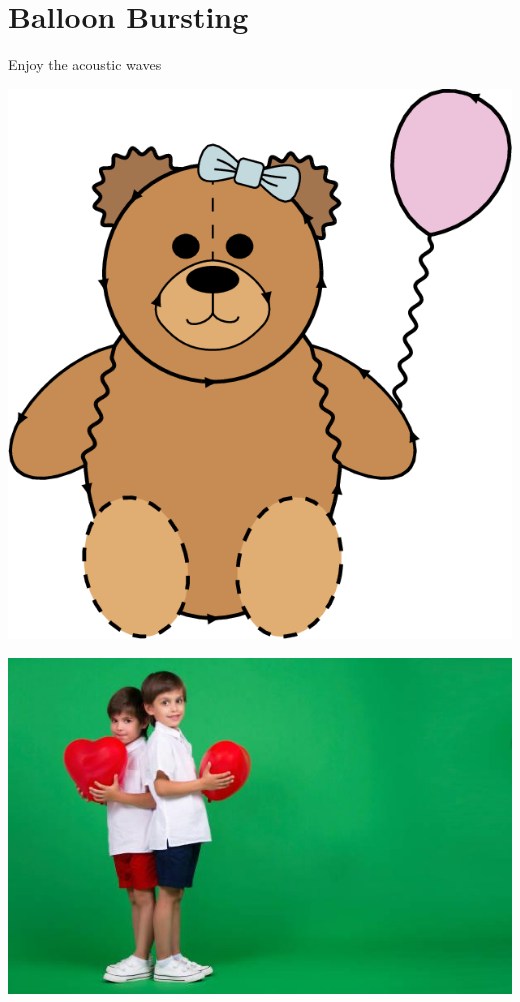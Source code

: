 \documentclass[makeidx, 11pt, oneside, onecolumn, openright, final, svgnames, dvipsnames, extrafontsizes]{memoir}
\begin{document}
\chapter{Balloon Bursting}
\thispagestyle{empty}
\vspace{-8mm}
\begin{center}
Enjoy the acoustic waves
\end{center}

\begin{center}
\includegraphics[scale=1]{teddybear.png}
\end{center}

\begin{center}
\includegraphics[scale=1]{ballon.jpeg}
\end{center}
\end{document}

